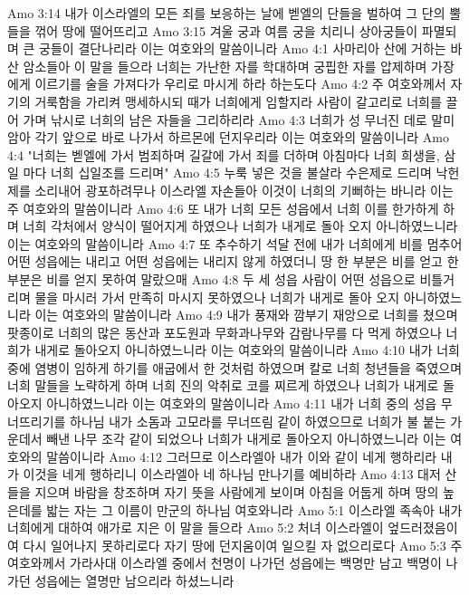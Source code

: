 Amo 3:14  내가 이스라엘의 모든 죄를 보응하는 날에 벧엘의 단들을 벌하여 그 단의 뿔들을 꺾어 땅에 떨어뜨리고
Amo 3:15  겨울 궁과 여름 궁을 치리니 상아궁들이 파멸되며 큰 궁들이 결단나리라 이는 여호와의 말씀이니라
Amo 4:1  사마리아 산에 거하는 바산 암소들아 이 말을 들으라 너희는 가난한 자를 학대하며 궁핍한 자를 압제하며 가장에게 이르기를 술을 가져다가 우리로 마시게 하라 하는도다
Amo 4:2  주 여호와께서 자기의 거룩함을 가리켜 맹세하시되 때가 너희에게 임할지라 사람이 갈고리로 너희를 끌어 가며 낚시로 너희의 남은 자들을 그리하리라
Amo 4:3  너희가 성 무너진 데로 말미암아 각기 앞으로 바로 나가서 하르몬에 던지우리라 이는 여호와의 말씀이니라
Amo 4:4  "너희는 벧엘에 가서 범죄하며 길갈에 가서 죄를 더하며 아침마다 너희 희생을, 삼일 마다 너희 십일조를 드리며"
Amo 4:5  누룩 넣은 것을 불살라 수은제로 드리며 낙헌제를 소리내어 광포하려무나 이스라엘 자손들아 이것이 너희의 기뻐하는 바니라 이는 주 여호와의 말씀이니라
Amo 4:6  또 내가 너희 모든 성읍에서 너희 이를 한가하게 하며 너희 각처에서 양식이 떨어지게 하였으나 너희가 내게로 돌아 오지 아니하였느니라 이는 여호와의 말씀이니라
Amo 4:7  또 추수하기 석달 전에 내가 너희에게 비를 멈추어 어떤 성읍에는 내리고 어떤 성읍에는 내리지 않게 하였더니 땅 한 부분은 비를 얻고 한 부분은 비를 얻지 못하여 말랐으매
Amo 4:8  두 세 성읍 사람이 어떤 성읍으로 비틀거리며 물을 마시러 가서 만족히 마시지 못하였으나 너희가 내게로 돌아 오지 아니하였느니라 이는 여호와의 말씀이니라
Amo 4:9  내가 풍재와 깜부기 재앙으로 너희를 쳤으며 팟종이로 너희의 많은 동산과 포도원과 무화과나무와 감람나무를 다 먹게 하였으나 너희가 내게로 돌아오지 아니하였느니라 이는 여호와의 말씀이니라
Amo 4:10  내가 너희 중에 염병이 임하게 하기를 애굽에서 한 것처럼 하였으며 칼로 너희 청년들을 죽였으며 너희 말들을 노략하게 하며 너희 진의 악취로 코를 찌르게 하였으나 너희가 내게로 돌아오지 아니하였느니라 이는 여호와의 말씀이니라
Amo 4:11  내가 너희 중의 성읍 무너뜨리기를 하나님 내가 소돔과 고모라를 무너뜨림 같이 하였으므로 너희가 불 붙는 가운데서 빼낸 나무 조각 같이 되었으나 너희가 내게로 돌아오지 아니하였느니라 이는 여호와의 말씀이니라
Amo 4:12  그러므로 이스라엘아 내가 이와 같이 네게 행하리라 내가 이것을 네게 행하리니 이스라엘아 네 하나님 만나기를 예비하라
Amo 4:13  대저 산들을 지으며 바람을 창조하며 자기 뜻을 사람에게 보이며 아침을 어둡게 하며 땅의 높은데를 밟는 자는 그 이름이 만군의 하나님 여호와니라
Amo 5:1  이스라엘 족속아 내가 너희에게 대하여 애가로 지은 이 말을 들으라
Amo 5:2  처녀 이스라엘이 엎드러졌음이여 다시 일어나지 못하리로다 자기 땅에 던지움이여 일으킬 자 없으리로다
Amo 5:3  주 여호와께서 가라사대 이스라엘 중에서 천명이 나가던 성읍에는 백명만 남고 백명이 나가던 성읍에는 열명만 남으리라 하셨느니라
